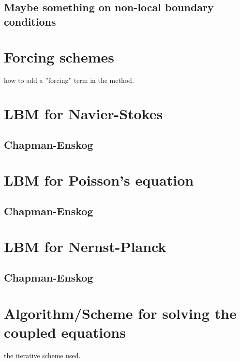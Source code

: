 \subsection{Maybe something on non-local boundary conditions}

\section{Forcing schemes}
how to add a ''forcing'' term in the method.

\section{LBM for Navier-Stokes}
\subsection{Chapman-Enskog}

\section{LBM for Poisson's equation}
\subsection{Chapman-Enskog}

\section{LBM for Nernst-Planck}
\subsection{Chapman-Enskog}

\section{Algorithm/Scheme for solving the coupled equations}
the iterative scheme used.
